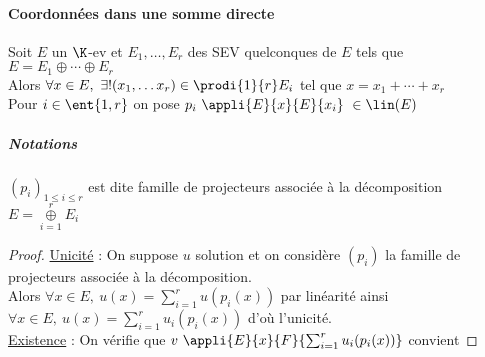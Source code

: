 		\paragraph{Coordonnées dans une somme directe}
			Soit $E$ un $\K$-ev et $E_1,\dots , E_r$ des SEV quelconques de $E$ tels que $E=E_1\oplus\cdots \oplus E_r$\\
			\hspace*{2.5cm} Alors $\forall x\in E, ~ \exists ! (x_1,\dots x_r) \in \prodi{1}{r} E_i$ tel que $x=x_1+\cdots +x_r$\\
			Pour $i\in \ent{1,r}$ on pose $p_i ~\appli{E}{x}{E}{x_i} ~ \in \lin (E)$ 
		\trait
		 \\
		\subparagraph{Notations}
			$(p_i)_{1\leqslant i\leqslant r}$ est dite famille de projecteurs associée à la décomposition $E=\overset{r}{\underset{i=1}{\oplus}} E_i$ 
		\vspace*{0.5cm} \\
		\begin{proof}
		\uline{Unicité} : On suppose $u$ solution et on considère $(p_i)$ la famille de projecteurs associée à la décomposition.\\
		Alors $\forall x\in E,~ u(x)=\sum_{i=1}^r u(p_i(x))$ par linéarité ainsi $\forall x\in E, ~ u(x) = \sum_{i=1}^r u_i(p_i(x))$ d'où l'unicité.\\
		\uline{Existence} : On vérifie que $v ~\appli{E}{x}{F}{\sum_{i=1}^r u_i(p_i(x))}$ convient
		\end{proof}
		
